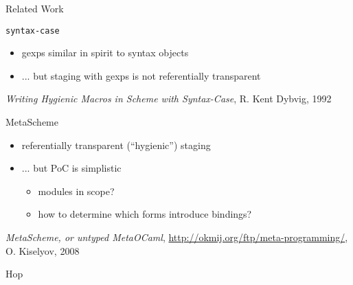 \documentclass{beamer}
\begin{document}
\begin{frame}[fragile]
  \Huge{Related Work}
\end{frame}

\begin{frame}[fragile]{\texttt{syntax-case}}
  \begin{itemize}
  \item gexps similar in spirit to syntax objects
  \item ... but staging with gexps is not referentially transparent
  \end{itemize}

  \vfill{}
  \small{
    \textit{Writing Hygienic Macros in Scheme with Syntax-Case}, R. Kent
    Dybvig, 1992
  }
\end{frame}

\begin{frame}[fragile]{MetaScheme}

  \begin{itemize}
  \item referentially transparent (``hygienic'') staging
  \item {... but PoC is simplistic
    \begin{itemize}
    \item modules in scope?
    \item how to determine which forms introduce bindings?
    \end{itemize}}
  \end{itemize}

  \vfill{}
  \small{
    \textit{MetaScheme, or untyped MetaOCaml},
    \url{http://okmij.org/ftp/meta-programming/}, O. Kiselyov, 2008
  }
\end{frame}

\begin{frame}[fragile]{Hop}

\end{frame}
\end{document}

